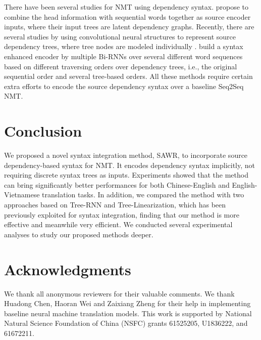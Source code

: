 \documentclass[11pt,a4paper]{article}
\begin{document}
\begin{CJK}{UTF8}{gbsn}
There have been several studies for NMT using dependency syntax.
 propose to combine the head information with sequential words together as source encoder inputs,
where their input trees are latent dependency graphs.
Recently, there are several studies by using convolutional neural structures to represent source dependency trees,
where tree nodes are modeled individually \cite{chen-EtAl:2017:EMNLP20173,bastings-EtAl:2017:EMNLP2017}.
 build a syntax enhanced encoder by multiple Bi-RNNs over several different word sequences based on different traversing orders over dependency trees, i.e., the original sequential order and several tree-based orders.
All these methods require certain extra efforts to encode the source dependency syntax over a baseline Seq2Seq NMT.




\section{Conclusion}
We proposed a novel syntax integration method, SAWR, to incorporate source dependency-based syntax for NMT.
It encodes dependency syntax implicitly, not requiring discrete syntax trees as inputs.
Experiments showed that the method can bring significantly better performances for both Chinese-English and English-Vietnamese translation tasks.
In addition,
we compared the method with two approaches based on Tree-RNN and Tree-Linearization, which has been previously exploited for syntax integration,
finding that our method is more effective and meanwhile very efficient.
We conducted several experimental analyses to study our proposed methods deeper.

\section*{Acknowledgments}
We thank all anonymous reviewers for their valuable comments.
We thank Huadong Chen, Haoran Wei and Zaixiang Zheng for their help in implementing
baseline neural machine translation models.
This work is supported by National Natural Science Foundation of China (NSFC) grants 61525205, U1836222, and 61672211.



\end{CJK}
\end{document}
